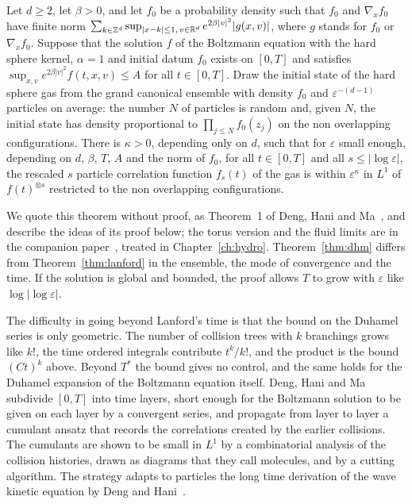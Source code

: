 \begin{theorem}
\label{thm:dhm}
Let $d\geq2$, let $\beta>0$, and let $f_0$ be a probability density such that $f_0$ and $\nabla_xf_0$ have finite norm $\sum_{k\in\mathbb{Z}^d}\sup_{|x-k|\leq1,\,v\in\mathbb{R}^d}e^{2\beta|v|^2}|g(x,v)|$, where $g$ stands for $f_0$ or $\nabla_xf_0$. Suppose that the solution $f$ of the Boltzmann equation with the hard sphere kernel, $\alpha = 1$ and initial datum $f_0$ exists on $[0,T]$ and satisfies $\sup_{x,v}e^{2\beta|v|^2}f(t,x,v)\leq A$ for all $t\in[0,T]$. Draw the initial state of the hard sphere gas from the grand canonical ensemble with density $f_0$ and $\varepsilon^{-(d-1)}$ particles on average: the number $N$ of particles is random and, given $N$, the initial state has density proportional to $\prod_{j\leq N}f_0(z_j)$ on the non overlapping configurations. There is $\kappa>0$, depending only on $d$, such that for $\varepsilon$ small enough, depending on $d$, $\beta$, $T$, $A$ and the norm of $f_0$, for all $t\in[0,T]$ and all $s\leq|\log\varepsilon|$, the rescaled $s$ particle correlation function $f_s(t)$ of the gas is within $\varepsilon^\kappa$ in $L^1$ of $f(t)^{\otimes s}$ restricted to the non overlapping configurations.
\end{theorem}

We quote this theorem without proof, as Theorem~1 of Deng, Hani and Ma~\cite{denghanima2024}, and describe the ideas of its proof below; the torus version and the fluid limits are in the companion paper~\cite{denghanima2025}, treated in Chapter~\ref{ch:hydro}. Theorem~\ref{thm:dhm} differs from Theorem~\ref{thm:lanford} in the ensemble, the mode of convergence and the time. If the solution is global and bounded, the proof allows $T$ to grow with $\varepsilon$ like $\log|\log\varepsilon|$.

The difficulty in going beyond Lanford's time is that the bound on the Duhamel series is only geometric. The number of collision trees with $k$ branchings grows like $k!$, the time ordered integrals contribute $t^k/k!$, and the product is the bound $(Ct)^k$ above. Beyond $T^*$ the bound gives no control, and the same holds for the Duhamel expansion of the Boltzmann equation itself. Deng, Hani and Ma subdivide $[0,T]$ into time layers, short enough for the Boltzmann solution to be given on each layer by a convergent series, and propagate from layer to layer a cumulant ansatz that records the correlations created by the earlier collisions. The cumulants are shown to be small in $L^1$ by a combinatorial analysis of the collision histories, drawn as diagrams that they call molecules, and by a cutting algorithm. The strategy adapts to particles the long time derivation of the wave kinetic equation by Deng and Hani~\cite{denghani2023}.

